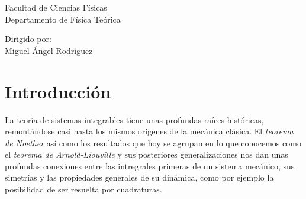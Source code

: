 \documentclass[11pt,a4paper,twoside]{article}
\theoremstyle{definition} \newtheorem{defn}[thm]{Definición}
\theoremstyle{definition} \newtheorem{ejemplo}[thm]{Ejemplo}
\theoremstyle{definition} \newtheorem{ejercicio}[thm]{Ejercicio}
\theoremstyle{remark} \newtheorem*{obs}{Observación}
\begin{document}
\begin{titlepage}
\vfill
\begin{minipage}{0.5\textwidth}

    Facultad de Ciencias Físicas \\
    Departamento de Física Teórica          
 \end{minipage}
 \hfill
\begin{minipage}{0.3\textwidth}
Dirigido por:\\
  Miguel Ángel Rodríguez
  \end{minipage}
\end{titlepage}


\tableofcontents

\section*{Introducción}
La teoría de sistemas integrables tiene unas profundas raíces históricas, remontándose casi hasta los mismos orígenes de la mecánica clásica. El \emph{teorema de Noether} así como los resultados que hoy se agrupan en lo que conocemos como el \emph{teorema de Arnold-Liouville} y sus posteriores generalizaciones nos dan unas profundas conexiones entre las intregrales primeras de un sistema mecánico, sus simetrías y las propiedades generales de su dinámica, como por ejemplo la posibilidad de ser resuelta por cuadraturas. 
\end{document}
